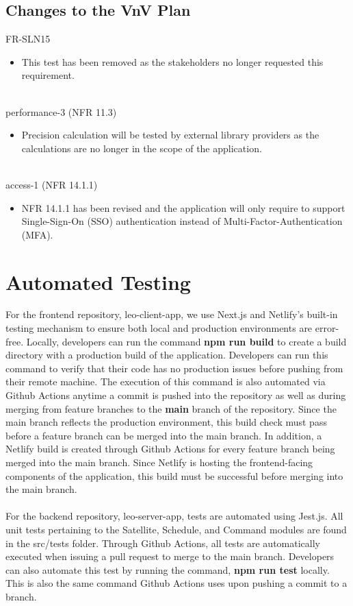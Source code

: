 \documentclass[12pt, titlepage]{article}
\begin{document}
\subsection{Changes to the VnV Plan}

FR-SLN15
\begin{itemize}
\item This test has been removed as the stakeholders no longer requested this requirement.
\end{itemize}
\\
performance-3 (NFR 11.3)
\begin{itemize}
\item Precision calculation will be tested by external library providers as the calculations are no longer in the scope of the application.
\end{itemize}
\\
access-1 (NFR 14.1.1)
\begin{itemize}
\item NFR 14.1.1 has been revised and the application will only require to support Single-Sign-On (SSO) authentication instead of Multi-Factor-Authentication (MFA).
\end{itemize}


\section{Automated Testing}

For the frontend repository, leo-client-app, we use Next.js and Netlify's built-in testing mechanism to ensure both local and production environments are error-free. Locally, developers can run the command \textbf{npm run build} to create a build directory with a production build of the application. Developers can run this command to verify that their code has no production issues before pushing from their remote machine. The execution of this command is also automated via Github Actions anytime a commit is pushed into the repository as well as during merging from feature branches to the \textbf{main} branch of the repository. Since the main branch reflects the production environment, this build check must pass before a feature branch can be merged into the main branch. In addition, a Netlify build is created through Github Actions for every feature branch being merged into the main branch. Since Netlify is hosting the frontend-facing components of the application, this build must be successful before merging into the main branch.
\\ \\
For the backend repository, leo-server-app, tests are automated using Jest.js. All unit tests pertaining to the Satellite, Schedule, and Command modules are found in the src/tests folder. Through Github Actions, all tests are automatically executed when issuing a pull request to merge to the main branch. Developers can also automate this test by running the command, \textbf{npm run test} locally. This is also the same command Github Actions uses upon pushing a commit to a branch.
		
\end{document}
